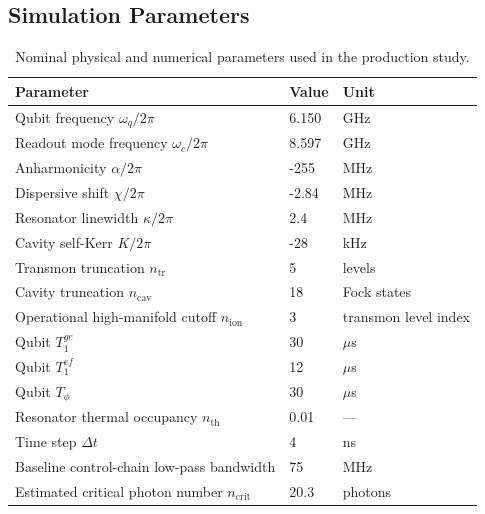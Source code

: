 \documentclass[11pt, a4paper]{article}
\begin{document}
\subsection{Simulation Parameters}
\begin{table}[H]
  \centering
  \caption{Nominal physical and numerical parameters used in the production study.}
  \begin{tabular}{@{} l l l @{}}
    \toprule
    Parameter & Value & Unit \\
    \midrule
    Qubit frequency $\omega_q/2\pi$ & 6.150 & GHz \\
    Readout mode frequency $\omega_c/2\pi$ & 8.597 & GHz \\
    Anharmonicity $\alpha/2\pi$ & -255 & MHz \\
    Dispersive shift $\chi/2\pi$ & -2.84 & MHz \\
    Resonator linewidth $\kappa/2\pi$ & 2.4 & MHz \\
    Cavity self-Kerr $K/2\pi$ & -28 & kHz \\
    Transmon truncation $n_{\mathrm{tr}}$ & 5 & levels \\
    Cavity truncation $n_{\mathrm{cav}}$ & 18 & Fock states \\
    Operational high-manifold cutoff $n_{\mathrm{ion}}$ & 3 & transmon level index \\
    Qubit $T_1^{ge}$ & 30 & $\mu$s \\
    Qubit $T_1^{ef}$ & 12 & $\mu$s \\
    Qubit $T_\phi$ & 30 & $\mu$s \\
    Resonator thermal occupancy $n_{\mathrm{th}}$ & 0.01 & --- \\
    Time step $\Delta t$ & 4 & ns \\
    Baseline control-chain low-pass bandwidth & 75 & MHz \\
    Estimated critical photon number $n_{\mathrm{crit}}$ & 20.3 & photons \\
    \bottomrule
  \end{tabular}
\end{table}
\end{document}
